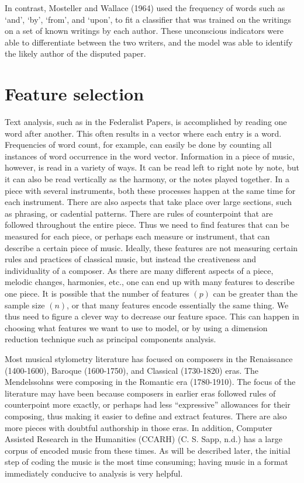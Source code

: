 \documentclass[12pt,twoside]{reedthesis}
\theoremstyle{definition}
\theoremstyle{definition}
\theoremstyle{definition}
\theoremstyle{remark}
\begin{document}
In contrast, Mosteller and Wallace (1964) used the frequency of words
such as `and', `by', `from', and `upon', to fit a classifier that was
trained on the writings on a set of known writings by each author. These
unconscious indicators were able to differentiate between the two
writers, and the model was able to identify the likely author of the
disputed paper.

\section{Feature selection}\label{feature-selection}

Text analysis, such as in the Federalist Papers, is accomplished by
reading one word after another. This often results in a vector where
each entry is a word. Frequencies of word count, for example, can easily
be done by counting all instances of word occurrence in the word vector.
Information in a piece of music, however, is read in a variety of ways.
It can be read left to right note by note, but it can also be read
vertically as the harmony, or the notes played together. In a piece with
several instruments, both these processes happen at the same time for
each instrument. There are also aspects that take place over large
sections, such as phrasing, or cadential patterns. There are rules of
counterpoint that are followed throughout the entire piece. Thus we need
to find features that can be measured for each piece, or perhaps each
measure or instrument, that can describe a certain piece of music.
Ideally, these features are not measuring certain rules and practices of
classical music, but instead the creativeness and individuality of a
composer. As there are many different aspects of a piece, melodic
changes, harmonies, etc., one can end up with many features to describe
one piece. It is possible that the number of features \((p)\) can be
greater than the sample size \((n)\), or that many features encode
essentially the same thing. We thus need to figure a clever way to
decrease our feature space. This can happen in choosing what features we
want to use to model, or by using a dimension reduction technique such
as principal components analysis.

Most musical stylometry literature has focused on composers in the
Renaissance (1400-1600), Baroque (1600-1750), and Classical (1730-1820)
eras. The Mendelssohns were composing in the Romantic era (1780-1910).
The focus of the literature may have been because composers in earlier
eras followed rules of counterpoint more exactly, or perhaps had less
``expressive'' allowances for their composing, thus making it easier to
define and extract features. There are also more pieces with doubtful
authorship in those eras. In addition, Computer Assisted Research in the
Humanities (CCARH) (C. S. Sapp, n.d.) has a large corpus of encoded
music from these times. As will be described later, the initial step of
coding the music is the most time consuming; having music in a format
immediately conducive to analysis is very helpful.
\end{document}
